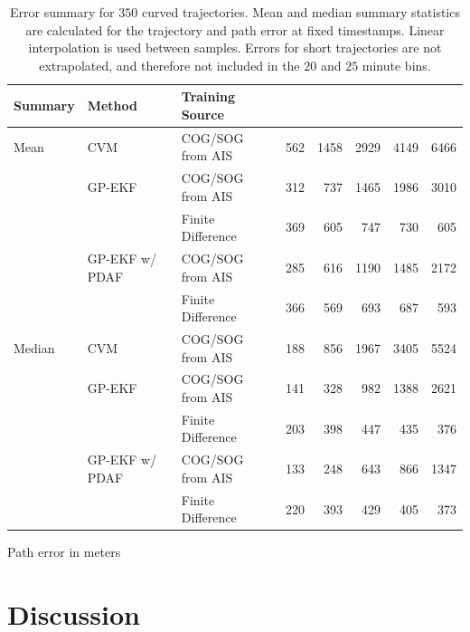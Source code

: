 \begin{table}
\begin{subtable}{\textwidth}
{\begin{tabular}{lllrrrrr}
                Summary & Method         & Training Source   &     &      &      &      &      \\
                \midrule
                Mean    & CVM            & COG/SOG from AIS  & 562 & 1458 & 2929 & 4149 & 6466 \\
                        & GP-EKF         & COG/SOG from AIS  & 312 & 737  & 1465 & 1986 & 3010 \\
                        &                & Finite Difference & 369 & 605  & 747  & 730  & 605  \\
                        & GP-EKF w/ PDAF & COG/SOG from AIS  & 285 & 616  & 1190 & 1485 & 2172 \\
                        &                & Finite Difference & 366 & 569  & 693  & 687  & 593  \\
                \midrule
                Median  & CVM            & COG/SOG from AIS  & 188 & 856  & 1967 & 3405 & 5524 \\
                        & GP-EKF         & COG/SOG from AIS  & 141 & 328  & 982  & 1388 & 2621 \\
                        &                & Finite Difference & 203 & 398  & 447  & 435  & 376  \\
                        & GP-EKF w/ PDAF & COG/SOG from AIS  & 133 & 248  & 643  & 866  & 1347 \\
                        &                & Finite Difference & 220 & 393  & 429  & 405  & 373  \\
                \bottomrule
            \end{tabular}
        }
        \caption{Path error in meters}
        \label{table:stats_curved_path_err}
    \end{subtable}
    \caption{Error summary for $350$ curved trajectories. Mean and median summary statistics are calculated for the trajectory and path error at fixed timestamps. Linear interpolation is used between samples. Errors for short trajectories are not extrapolated, and therefore not included in the $20$ and $25$ minute bins.}
    \label{table:stats_curved_error}
\end{table}


\section{Discussion}

